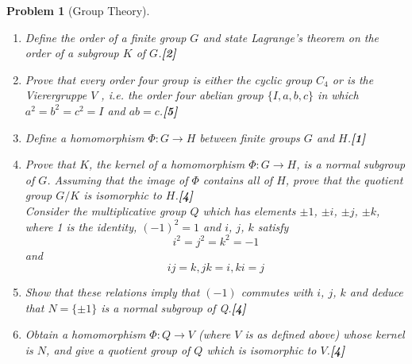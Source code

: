 \documentclass[a4paper]{article}
\theoremstyle{new}
\newtheorem{qns}{Problem}[section]
\begin{document}
\begin{qns}[Group Theory]\leavevmode
\begin{enumerate}[label=(\roman*)]
    \item Define the order of a finite group $G$ and state Lagrange’s theorem on the order of a subgroup $K$ of $G$.\hfill\textbf{[2]}
    \item Prove that every order four group is either the cyclic group $C_4$ or is the Vierergruppe $V$ , i.e. the order four abelian group $\{I, a, b, c\}$ in which $a^2 = b^2 = c^2 = I$ and $ab = c$.\hfill\textbf{[5]}
    \item Define a homomorphism $\Phi:G\rightarrow H$ between finite groups $G$ and $H$.\hfill\textbf{[1]}
    \item Prove that $K$, the kernel of a homomorphism $\Phi:G\rightarrow H$, is a normal subgroup of $G$. Assuming that the image of $\Phi$ contains all of $H$, prove that the quotient group $G/K$ is isomorphic to $H$.\hfill\textbf{[4]}\\[5pt]
    Consider the multiplicative group $Q$ which has elements $\pm1$, $\pm i$, $\pm j$, $\pm k$, where 1 is the identity, $(−1)^2 = 1$ and $i$, $j$, $k$ satisfy
$$i^2 = j^2 = k^2 = −1$$
and
$$ij = k, jk = i, ki = j$$
\item Show that these relations imply that $(−1)$ commutes with $i$, $j$, $k$ and deduce that $N = \{\pm 1\}$ is a normal subgroup of Q.\hfill\textbf{[4]}
    \item Obtain a homomorphism $\Phi:Q\rightarrow V$ (where $V$ is as defined above) whose kernel is
$N$, and give a quotient group of $Q$ which is isomorphic to $V$.\hfill\textbf{[4]}
\end{enumerate}
\end{qns}
\end{document}
